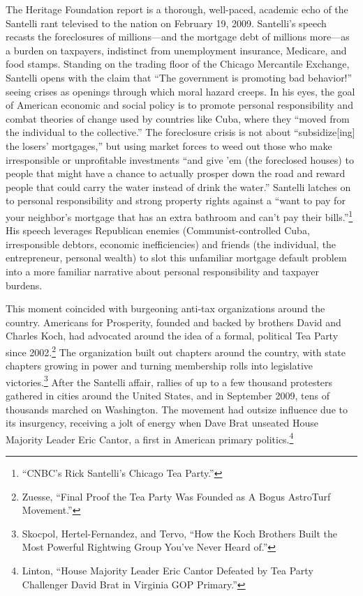 \documentclass[
]{article}
\let\rmarkdownfootnote\footnote%
\def\footnote{\protect\rmarkdownfootnote}
\begin{document}
The Heritage Foundation report is a thorough, well-paced, academic echo
of the Santelli rant televised to the nation on February 19, 2009.
Santelli's speech recasts the foreclosures of millions---and the
mortgage debt of millions more---as a burden on taxpayers, indistinct
from unemployment insurance, Medicare, and food stamps. Standing on the
trading floor of the Chicago Mercantile Exchange, Santelli opens with
the claim that ``The government is promoting bad behavior!'' seeing
crises as openings through which moral hazard creeps. In his eyes, the
goal of American economic and social policy is to promote personal
responsibility and combat theories of change used by countries like
Cuba, where they ``moved from the individual to the collective.'' The
foreclosure crisis is not about ``subsidize{[}ing{]} the losers'
mortgages,'' but using market forces to weed out those who make
irresponsible or unprofitable investments ``and give 'em (the foreclosed
houses) to people that might have a chance to actually prosper down the
road and reward people that could carry the water instead of drink the
water.'' Santelli latches on to personal responsibility and strong
property rights against a ``want to pay for your neighbor's mortgage
that has an extra bathroom and can't pay their bills.''\footnote{``CNBC's
  Rick Santelli's Chicago Tea Party.''} His speech leverages Republican
enemies (Communist-controlled Cuba, irresponsible debtors, economic
inefficiencies) and friends (the individual, the entrepreneur, personal
wealth) to slot this unfamiliar mortgage default problem into a more
familiar narrative about personal responsibility and taxpayer burdens.

This moment coincided with burgeoning anti-tax organizations around the
country. Americans for Prosperity, founded and backed by brothers David
and Charles Koch, had advocated around the idea of a formal, political
Tea Party since 2002.\footnote{Zuesse, ``Final Proof the Tea Party Was
  Founded as A Bogus AstroTurf Movement.''} The organization built out
chapters around the country, with state chapters growing in power and
turning membership rolls into legislative victories.\footnote{Skocpol,
  Hertel-Fernandez, and Tervo, ``How the Koch Brothers Built the Most
  Powerful Rightwing Group You've Never Heard of.''} After the Santelli
affair, rallies of up to a few thousand protesters gathered in cities
around the United States, and in September 2009, tens of thousands
marched on Washington. The movement had outsize influence due to its
insurgency, receiving a jolt of energy when Dave Brat unseated House
Majority Leader Eric Cantor, a first in American primary
politics.\footnote{Linton, ``House Majority Leader Eric Cantor Defeated
  by Tea Party Challenger David Brat in Virginia GOP Primary.''}
\end{document}
